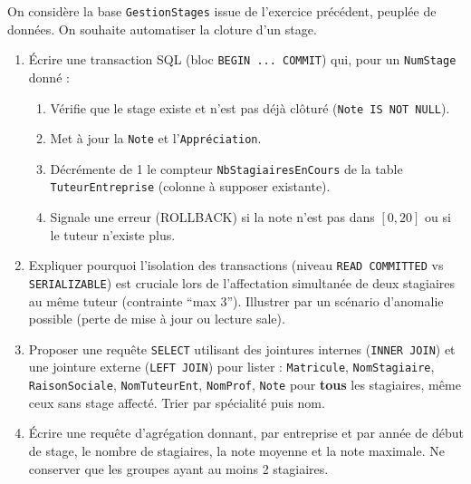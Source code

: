 \documentclass[11pt]{article}
\begin{document}
\begin{exercice}
On considère la base \texttt{GestionStages} issue de l'exercice précédent, peuplée de données. On souhaite automatiser la cloture d'un stage.
\begin{enumerate}
    \item Écrire une transaction SQL (bloc \texttt{BEGIN ... COMMIT}) qui, pour un \texttt{NumStage} donné :
    \begin{enumerate}
        \item Vérifie que le stage existe et n'est pas déjà clôturé (\texttt{Note IS NOT NULL}).
        \item Met à jour la \texttt{Note} et l'\texttt{Appréciation}.
        \item Décrémente de 1 le compteur \texttt{NbStagiairesEnCours} de la table \texttt{TuteurEntreprise} (colonne à supposer existante).
        \item Signale une erreur (ROLLBACK) si la note n'est pas dans $[0, 20]$ ou si le tuteur n'existe plus.
    \end{enumerate}
    \item Expliquer pourquoi l'isolation des transactions (niveau \texttt{READ COMMITTED} vs \texttt{SERIALIZABLE}) est cruciale lors de l'affectation simultanée de deux stagiaires au même tuteur (contrainte ``max 3''). Illustrer par un scénario d'anomalie possible (perte de mise à jour ou lecture sale).
    \item Proposer une requête \texttt{SELECT} utilisant des jointures internes (\texttt{INNER JOIN}) et une jointure externe (\texttt{LEFT JOIN}) pour lister : \texttt{Matricule}, \texttt{NomStagiaire}, \texttt{RaisonSociale}, \texttt{NomTuteurEnt}, \texttt{NomProf}, \texttt{Note} pour \textbf{tous} les stagiaires, même ceux sans stage affecté. Trier par spécialité puis nom.
    \item Écrire une requête d'agrégation donnant, par entreprise et par année de début de stage, le nombre de stagiaires, la note moyenne et la note maximale. Ne conserver que les groupes ayant au moins 2 stagiaires.
\end{enumerate}
\end{exercice}
\end{document}
